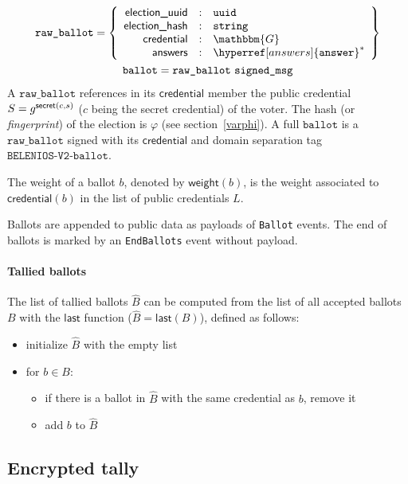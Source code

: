 \documentclass[a4paper]{article}
\newcommand{\dstprefix}{BELENIOS-V2}
\newcommand{\G}{\mathbbm{G}}
\newcommand{\jstring}{\texttt{string}}
\newcommand{\uuid}{\texttt{uuid}}
\newcommand{\ballot}{\texttt{ballot}}
\begin{document}
\newcommand{\json}{\textsf{JSON}}

\begin{gather*}
  \texttt{raw\_ballot}=\left\{
    \begin{array}{rcl}
      \textsf{election\_uuid}&:&\uuid\\
      \textsf{election\_hash}&:&\jstring\\
      \textsf{credential}&:&\G\\
      \answers&:&\hyperref[answers]{\answer}^\ast
    \end{array}
  \right\}\\
  \ballot=\texttt{raw\_ballot}\ \texttt{signed\_msg}
\end{gather*}
A $\texttt{raw\_ballot}$ references in its $\textsf{credential}$
member the public credential $S=g^{\textsf{secret}(c,s)}$ ($c$ being the
secret credential) of the voter. The hash (or \emph{fingerprint}) of
the election is $\varphi$ (see section~\ref{varphi}).  A full
$\ballot$ is a $\texttt{raw\_ballot}$ signed with its
$\textsf{credential}$ and domain separation tag
$\texttt{\dstprefix-ballot}$.

The weight of a ballot $b$, denoted by $\textsf{weight}(b)$, is the
weight associated to $\textsf{credential}(b)$ in the list of public
credentials $L$.

Ballots are appended to public data as payloads of \texttt{Ballot}
events. The end of ballots is marked by an \texttt{EndBallots} event
without payload.

\paragraph{Tallied ballots}
\label{tallied-ballots}
The list of tallied ballots $\hat B$ can be computed from the list of
all accepted ballots $B$ with the $\textsf{last}$ function
($\hat B=\textsf{last}(B)$), defined as follows:
\begin{itemize}
\item initialize $\hat B$ with the empty list
\item for $b\in B$:
  \begin{itemize}
  \item if there is a ballot in $\hat B$ with the same credential as
    $b$, remove it
  \item add $b$ to $\hat B$
  \end{itemize}
\end{itemize}

\subsection{Encrypted tally}
\label{tally}
\end{document}
